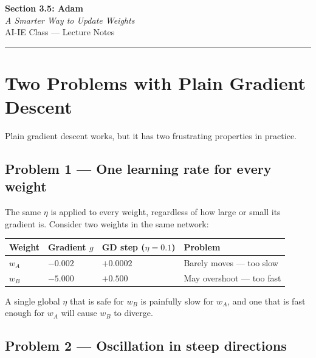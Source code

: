 \documentclass[12pt, a4paper]{article}
\newif\ifstudentmode
\theoremstyle{definition}
\begin{document}
\begin{center}
  {\LARGE \textbf{Section 3.5: Adam}} \\[0.3em]
  {\large\itshape A Smarter Way to Update Weights} \\[0.5em]
  {\large AI-IE Class --- Lecture Notes}%
  \ifstudentmode
    \quad {\normalsize\color{gray}[Student Copy]}%
  \fi
\end{center}

\vspace{1em}
\hrule
\vspace{1.5em}

\section{Two Problems with Plain Gradient Descent}

Plain gradient descent works, but it has two frustrating properties in
practice.

\subsection*{Problem 1 — One learning rate for every weight}

The same $\eta$ is applied to every weight, regardless of how large or small
its gradient is.  Consider two weights in the same network:

\begin{center}
  \renewcommand{\arraystretch}{1.3}
  \begin{tabular}{llll}
    \toprule
    Weight & Gradient $g$ & GD step ($\eta=0.1$) & Problem                    \\
    \midrule
    $w_A$  & $-0.002$     & $+0.0002$            & Barely moves --- too slow  \\
    $w_B$  & $-5.000$     & $+0.500$             & May overshoot --- too fast \\
    \bottomrule
  \end{tabular}
\end{center}

A single global $\eta$ that is safe for $w_B$ is painfully slow for $w_A$,
and one that is fast enough for $w_A$ will cause $w_B$ to diverge.

\subsection*{Problem 2 — Oscillation in steep directions}
\end{document}
